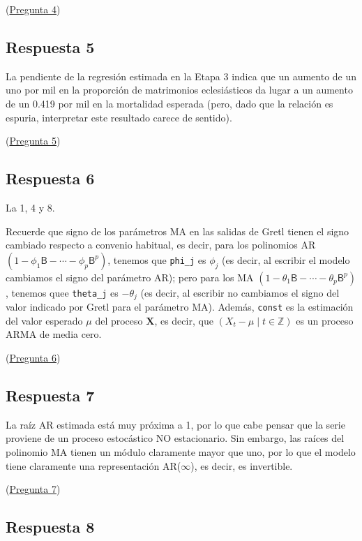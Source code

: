 \documentclass[10pt]{article}
\begin{document}
(\hyperref[sec:org80cbdbe]{Pregunta 4})
\subsection*{Respuesta 5}
\label{sec:org8cb8752}

La pendiente de la regresión estimada en la Etapa 3 indica que un
aumento de un uno por mil en la proporción de matrimonios
eclesiásticos da lugar a un aumento de un 0.419 por mil en la
mortalidad esperada (pero, dado que la relación es espuria,
interpretar este resultado carece de sentido).

(\hyperref[sec:org3d28104]{Pregunta 5})
\subsection*{Respuesta 6}
\label{sec:orgdb7a15e}

La 1, 4 y 8. 

Recuerde que signo de los parámetros MA en las salidas de Gretl tienen
el signo cambiado respecto a convenio habitual, es decir, para los
polinomios AR \((1-\phi_1\mathsf{B}-\cdots-\phi_p\mathsf{B}^p)\),
tenemos que \texttt{phi\_j} es \(\phi_j\) (es decir, al escribir el modelo
cambiamos el signo del parámetro AR); pero para los MA
\((1-\theta_1\mathsf{B}-\cdots-\theta_p\mathsf{B}^p)\), tenemos quee
\texttt{theta\_j} es \(-\theta_j\) (es decir, al escribir no cambiamos el signo
del valor indicado por Gretl para el parámetro MA). Además, \texttt{const} es
la estimación del valor esperado \(\mu\) del proceso \(\boldsymbol{X}\),
es decir, que \((X_t-\mu\mid t\in\mathbb{Z})\) es un proceso ARMA de
media cero.

(\hyperref[sec:orgc23d411]{Pregunta 6})
\subsection*{Respuesta 7}
\label{sec:orgaa60221}

La raíz AR estimada está muy próxima a 1, por lo que cabe pensar que
la serie proviene de un proceso estocástico NO estacionario. Sin
embargo, las raíces del polinomio MA tienen un módulo claramente mayor
que uno, por lo que el modelo tiene claramente una representación
AR(\(\infty\)), es decir, es invertible.

(\hyperref[sec:org8a4dedf]{Pregunta 7})
\subsection*{Respuesta 8}
\label{sec:org7490a39}
\end{document}

